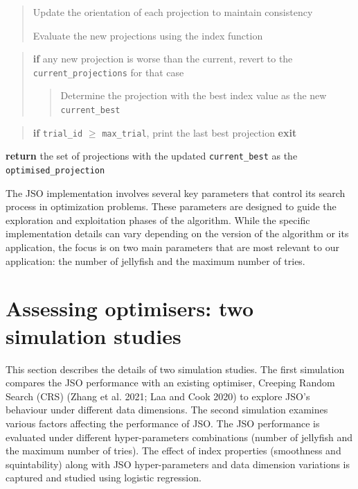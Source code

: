 \documentclass[
  12pt,
]{interact}
\theoremstyle{plain}
\begin{document}
\begin{tcolorbox}
\begin{quote}
Update the orientation of each projection to maintain consistency

Evaluate the new projections using the index function
\end{quote}

\begin{quote}
\textbf{if} any new projection is worse than the current, revert to the
\texttt{current\_projections} for that case

\begin{quote}
Determine the projection with the best index value as the new
\texttt{current\_best}
\end{quote}
\end{quote}

\begin{quote}
\textbf{if} \texttt{trial\_id} \(\ge\) \texttt{max\_trial}, print the
last best projection \textbf{exit}
\end{quote}

\textbf{return} the set of projections with the updated
\texttt{current\_best} as the \texttt{optimised\_projection}

\end{tcolorbox}

The JSO implementation involves several key parameters that control its
search process in optimization problems. These parameters are designed
to guide the exploration and exploitation phases of the algorithm. While
the specific implementation details can vary depending on the version of
the algorithm or its application, the focus is on two main parameters
that are most relevant to our application: the number of jellyfish and
the maximum number of tries.

\section{Assessing optimisers: two simulation
studies}\label{sec-sim-deets}

This section describes the details of two simulation studies. The first
simulation compares the JSO performance with an existing optimiser,
Creeping Random Search (CRS) (Zhang et al. 2021; Laa and Cook 2020) to
explore JSO's behaviour under different data dimensions. The second
simulation examines various factors affecting the performance of JSO.
The JSO performance is evaluated under different hyper-parameters
combinations (number of jellyfish and the maximum number of tries). The
effect of index properties (smoothness and squintability) along with JSO
hyper-parameters and data dimension variations is captured and studied
using logistic regression.
\end{document}
